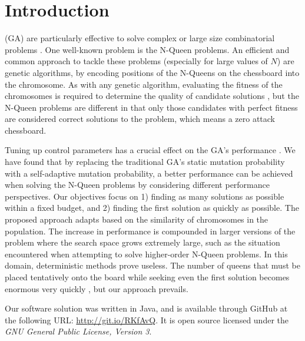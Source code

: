 \documentclass[conference]{IEEEtran}
\begin{document}

\section{Introduction}
 (GA) are particularly effective to solve complex or large size combinatorial problems \cite{cit:1,cit:2}. One well-known problem is the N-Queen problems. An efficient and common approach to tackle these problems (especially for large values of $N$) are genetic algorithms, by encoding positions of the N-Queens on the chessboard into the chromosome. As with any genetic algorithm, evaluating the fitness of the chromosomes is required to determine the quality of candidate solutions \cite{cit:8}, but the N-Queen problems are different in that only those candidates with perfect fitness are considered correct solutions to the problem, which means a zero attack chessboard. 

Tuning up control parameters has a crucial effect on the GA's performance \cite{cit:12,cit:13,cit:15,cit:7}. We have found that by replacing the traditional GA's static mutation probability with a self-adaptive mutation probability, a better performance can be achieved when solving the N-Queen problems by considering different performance perspectives. Our objectives focus on 1) finding as many solutions as possible within a fixed budget, and 2) finding the first solution as quickly as possible. The proposed approach adapts based on the similarity of chromosomes in the population. The increase in performance is compounded in larger versions of the problem where the search space grows extremely large, such as the situation encountered when attempting to solve higher-order N-Queen problems. In this domain, deterministic methods prove useless. The number of queens that must be placed tentatively onto the board while seeking even the first solution becomes enormous very quickly \cite{cit:21}, but our approach prevails.

Our software solution was written in Java, and is available through GitHub at the following URL: \url{http://git.io/RKfAvQ}. It is open source licensed under the \textit{GNU General Public License, Version 3}.
\end{document}
